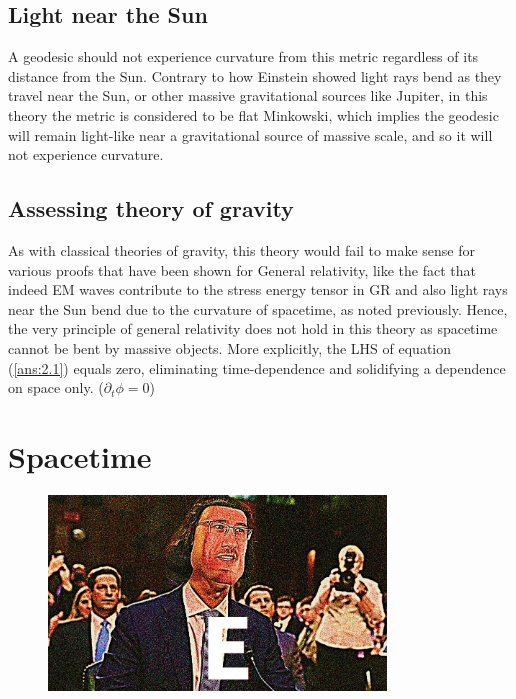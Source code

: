 \documentclass{article}
\begin{document}
	\subsection{Light near the Sun}
	A geodesic should not experience curvature from this metric regardless of its distance from the Sun. Contrary to how Einstein showed light rays bend as they travel near the Sun, or other massive gravitational sources like Jupiter, in this theory the metric is considered to be flat Minkowski, which implies the geodesic will remain light-like near a gravitational source of massive scale, and so it will not experience curvature.
	\pagebreak
	
	\subsection{Assessing theory of gravity}
	As with classical theories of gravity, this theory would fail to make sense for various proofs that have been shown for General relativity, like the fact that indeed EM waves contribute to the stress energy tensor in GR and also light rays near the Sun bend due to the curvature of spacetime, as noted previously. Hence, the very principle of general relativity does not hold in this theory as spacetime cannot be bent by massive objects. More explicitly, the LHS of equation (\ref{ans:2.1}) equals zero, eliminating time-dependence and solidifying a dependence on space only. ($\partial_t \phi = 0$) 
 	
 	\pagebreak
 	\section{Spacetime}
 	\begin{figure}[h]
 		\includegraphics[width=0.8\textwidth]{e}
 	\end{figure}
\end{document}
